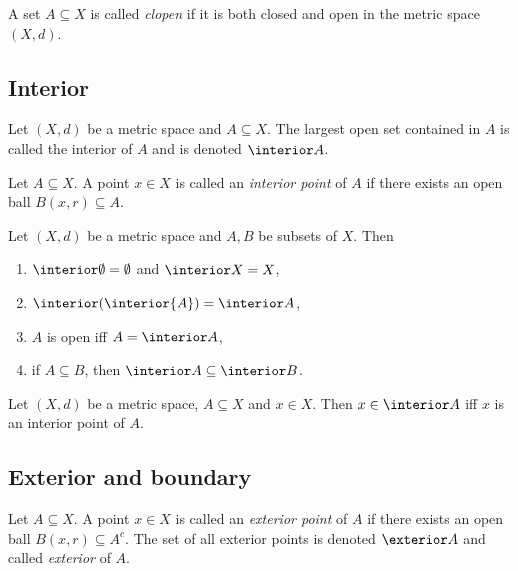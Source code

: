\documentclass{article}
\begin{document}
\begin{definition}
    A set $A\subseteq X$ is called \emph{clopen} if it is both closed and open
    in the metric space $(X,d)$.
\end{definition}

\subsection{Interior}

\begin{definition}
    Let $(X,d)$ be a metric space and $A\subseteq X$. The largest open set contained in $A$
    is called the interior of $A$ and is denoted $\interior A$.
\end{definition}

\begin{definition}
    Let $A\subseteq X$. A point $x\in X$ is called an \emph{interior point} of $A$ if 
    there exists an open ball $B(x,r)\subseteq A$. 
\end{definition}

\begin{proposition}[Notes 4.24]
    Let $(X,d)$ be a metric space and $A,B$ be subsets of $X$. Then 
    \begin{enumerate}
        \item $\interior\emptyset=\emptyset$ and $\interior X=X$,
        \item $\interior(\interior{A})=\interior A$, 
        \item $A$ is open iff $A=\interior A$,
        \item if $A\subseteq B$, then $\interior A\subseteq\interior B$.
    \end{enumerate} 
\end{proposition}

\begin{proposition}[Notes 4.25]
    Let $(X,d)$ be a metric space, $A\subseteq X$ and $x\in X$. Then $x\in\interior A$ iff 
    $x$ is an interior point of $A$.
\end{proposition}

\subsection{Exterior and boundary}

\begin{definition}
    Let $A\subseteq X$. A point $x\in X$ is called an \emph{exterior point} of $A$ if 
    there exists an open ball $B(x,r)\subseteq A^c$. The set of all exterior points is denoted 
    $\exterior A$ and called \emph{exterior} of $A$.
\end{definition}
\end{document}
